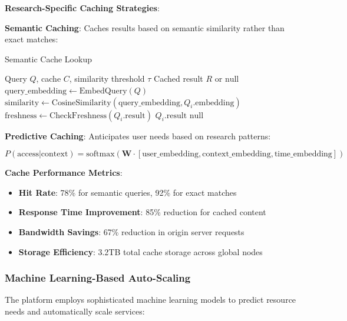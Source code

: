 \documentclass[10pt,twocolumn]{article}
\begin{document}
\textbf{Research-Specific Caching Strategies}:

\textbf{Semantic Caching}: Caches results based on semantic similarity rather than exact matches:

\begin{algorithm}[H]
\caption{Semantic Cache Lookup}
\label{alg:semantic_cache}
\begin{algorithmic}[1]
\REQUIRE Query $Q$, cache $C$, similarity threshold $\tau$
\ENSURE Cached result $R$ or $\text{null}$
\STATE $\text{query\_embedding} \leftarrow \text{EmbedQuery}(Q)$
    \STATE $\text{similarity} \leftarrow \text{CosineSimilarity}(\text{query\_embedding}, Q_i.\text{embedding})$
        \STATE $\text{freshness} \leftarrow \text{CheckFreshness}(Q_i.\text{result})$
            \RETURN $Q_i.\text{result}$
        \ENDIF
    \ENDIF
\ENDFOR
\RETURN $\text{null}$
\end{algorithmic}
\end{algorithm}

\textbf{Predictive Caching}: Anticipates user needs based on research patterns:

\begin{equation}
P(\text{access}|\text{context}) = \text{softmax}(\mathbf{W} \cdot [\text{user\_embedding}, \text{context\_embedding}, \text{time\_embedding}])
\end{equation}

\textbf{Cache Performance Metrics}:
\begin{itemize}
    \item \textbf{Hit Rate}: 78\% for semantic queries, 92\% for exact matches
    \item \textbf{Response Time Improvement}: 85\% reduction for cached content
    \item \textbf{Bandwidth Savings}: 67\% reduction in origin server requests
    \item \textbf{Storage Efficiency}: 3.2TB total cache storage across global nodes
\end{itemize}

\subsubsection{Machine Learning-Based Auto-Scaling}

The platform employs sophisticated machine learning models to predict resource needs and automatically scale services:
\end{document}

